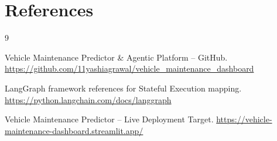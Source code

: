 \documentclass[12pt, a4paper]{article}
\begin{document}
\section{References}
\begingroup
\renewcommand{\section}[2]{}
\begin{thebibliography}{9}

Vehicle Maintenance Predictor \& Agentic Platform – GitHub.  
\url{https://github.com/11yashiagrawal/vehicle_maintenance_dashboard}

LangGraph framework references for Stateful Execution mapping.
\url{https://python.langchain.com/docs/langgraph}

Vehicle Maintenance Predictor – Live Deployment Target.  
\url{https://vehicle-maintenance-dashboard.streamlit.app/}

\end{thebibliography}
\end{document}
